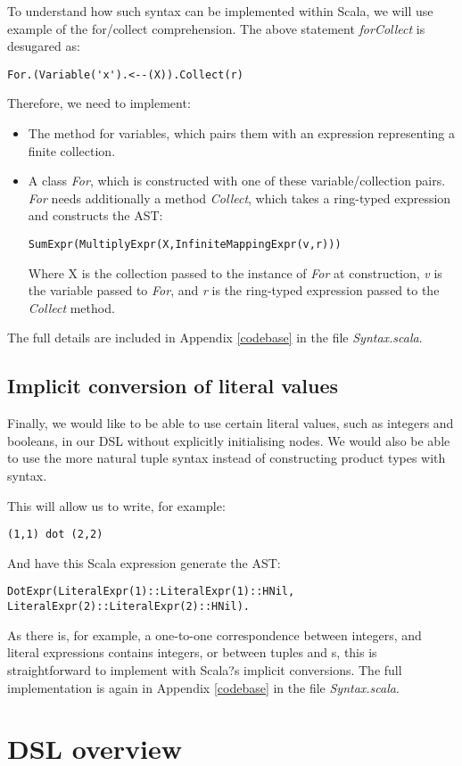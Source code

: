 To understand how such syntax can be implemented within Scala, we will use example of the for/collect comprehension. The above statement \textit{forCollect} is desugared as:
\vs \begin{lstlisting}
For.(Variable('x').<--(X)).Collect(r)
\end{lstlisting}\vs
Therefore, we need to implement:
\begin{itemize}
\item{The \lin{<--} method for variables, which pairs them with an expression  representing a finite collection.}
\item{A class  \textit{For}, which is constructed with one of these variable/collection pairs. \textit{For} needs additionally a method \textit{Collect}, which takes a ring-typed expression and constructs the AST:
\vs\begin{lstlisting}
SumExpr(MultiplyExpr(X,InfiniteMappingExpr(v,r)))
\end{lstlisting}\vs
Where X is the collection passed to the instance of \textit{For} at construction, \textit{v} is the variable passed to \textit{For}, and \textit{r} is the ring-typed expression passed to the \textit{Collect} method.
}
\end{itemize}

The full details are included in Appendix \ref{codebase} in the file \textit{Syntax.scala}.

\subsection{Implicit conversion of literal values}

Finally, we would like to be able to use certain literal values, such as integers and booleans, in our DSL without explicitly initialising  nodes. We would also be able to use the more natural tuple syntax instead of constructing product types with  syntax. 

This will allow us to write, for example:
\vs\begin{lstlisting}
(1,1) dot (2,2)
\end{lstlisting}\vs
And have this Scala expression generate the AST:
\vs\begin{lstlisting}
DotExpr(LiteralExpr(1)::LiteralExpr(1)::HNil, LiteralExpr(2)::LiteralExpr(2)::HNil).
\end{lstlisting}\vs
As there is, for example, a one-to-one correspondence between integers, and literal expressions contains integers, or between tuples and s, this is straightforward to implement with Scala?s implicit conversions. The full implementation is again in Appendix \ref{codebase} in the file \textit{Syntax.scala}.

\section{DSL overview}

